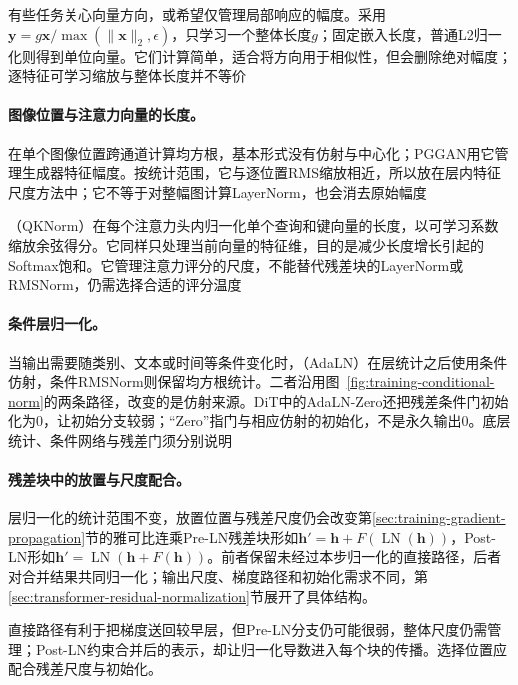 有些任务关心向量方向，或希望仅管理局部响应的幅度。采用$\bm y=g\bm x/\max(\lVert\bm x\rVert_2,\epsilon)$，只学习一个整体长度$g$；固定嵌入长度，普通L2归一化则得到单位向量。它们计算简单，适合将方向用于相似性，但会删除绝对幅度；逐特征可学习缩放与整体长度并不等价

\paragraph{图像位置与注意力向量的长度。}

在单个图像位置跨通道计算均方根，基本形式没有仿射与中心化；PGGAN用它管理生成器特征幅度。按统计范围，它与逐位置RMS缩放相近，所以放在层内特征尺度方法中；它不等于对整幅图计算LayerNorm，也会消去原始幅度

（QKNorm）在每个注意力头内归一化单个查询和键向量的长度，以可学习系数缩放余弦得分。它同样只处理当前向量的特征维，目的是减少长度增长引起的Softmax饱和。它管理注意力评分的尺度，不能替代残差块的LayerNorm或RMSNorm，仍需选择合适的评分温度

\paragraph{条件层归一化。}

当输出需要随类别、文本或时间等条件变化时，（AdaLN）在层统计之后使用条件仿射，条件RMSNorm则保留均方根统计。二者沿用图~\ref{fig:training-conditional-norm}的两条路径，改变的是仿射来源。DiT中的AdaLN-Zero还把残差条件门初始化为0，让初始分支较弱；“Zero”指门与相应仿射的初始化，不是永久输出0。底层统计、条件网络与残差门须分别说明

\paragraph{残差块中的放置与尺度配合。}

层归一化的统计范围不变，放置位置与残差尺度仍会改变第\ref{sec:training-gradient-propagation}节的雅可比连乘Pre-LN残差块形如$\bm h'=\bm h+F(\operatorname{LN}(\bm h))$，Post-LN形如$\bm h'=\operatorname{LN}(\bm h+F(\bm h))$。前者保留未经过本步归一化的直接路径，后者对合并结果共同归一化；输出尺度、梯度路径和初始化需求不同，第\ref{sec:transformer-residual-normalization}节展开了具体结构。

直接路径有利于把梯度送回较早层，但Pre-LN分支仍可能很弱，整体尺度仍需管理；Post-LN约束合并后的表示，却让归一化导数进入每个块的传播。选择位置应配合残差尺度与初始化。

